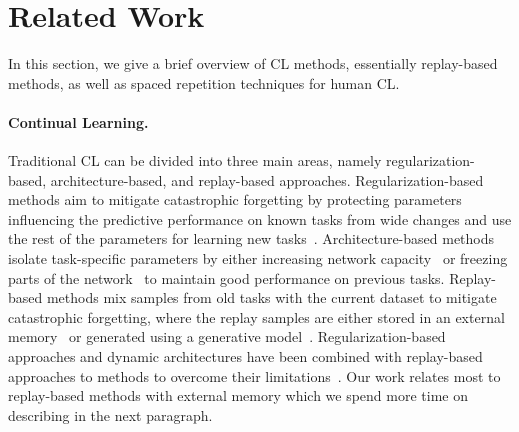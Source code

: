 
\section{Related Work}\label{sec:related_work}
In this section, we give a brief overview of CL methods, essentially replay-based methods, as well as spaced repetition techniques for human CL.

\vspace{-3mm}
\paragraph{Continual Learning.} Traditional CL can be divided into three main areas, namely regularization-based, architecture-based, and replay-based approaches. Regularization-based methods aim to mitigate catastrophic forgetting by protecting parameters influencing the predictive performance on known tasks from wide changes and use the rest of the parameters for learning new tasks~\citep{adel2019continual, chaudhry2018riemannian, kirkpatrick2017overcoming, li2017learning, nguyen2017variational, rannen2017encoder, schwarz2018progress, zenke2017continual}. Architecture-based methods isolate task-specific parameters by either increasing network capacity~\citep{rusu2016progressive, yoon2019scalable, yoon2017lifelong} or freezing parts of the network~\citep{mallya2018packnet, serra2018overcoming} to maintain good performance on previous tasks. 
Replay-based methods mix samples from old tasks with the current dataset to mitigate catastrophic forgetting, where the replay samples are either stored in an external memory~\citep{chaudhry2019tiny, hayes2020remind, isele2018selective, lopez2017gradient} or generated using a generative model~\citep{shin2017continual, van2018generative}. 
Regularization-based approaches and dynamic architectures have been combined with replay-based approaches to methods to overcome their limitations~\citep{buzzega2020dark, chaudhry2018riemannian, chaudhry2018efficient, chaudhry2021using, douillard2020podnet, ebrahimi2020adversarial, joseph2020meta, mirzadeh2020linear, nguyen2017variational, pan2020continual, pellegrini2019latent, rolnick2018experience, von2019continual}. Our work relates most to replay-based methods with external memory which we spend more time on describing in the next paragraph.




